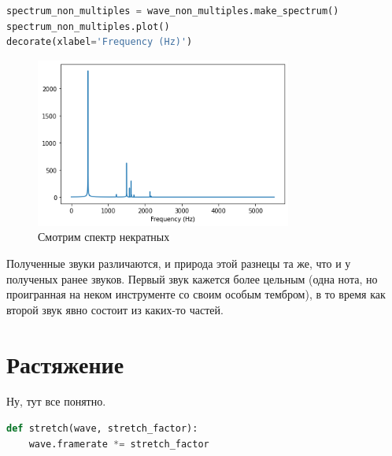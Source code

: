 \documentclass[a4paper,12pt]{report}
\begin{document}
\begin{lstlisting}[language=Python,caption=Смотрим спектр некратных]
spectrum_non_multiples = wave_non_multiples.make_spectrum()
spectrum_non_multiples.plot()
decorate(xlabel='Frequency (Hz)')
\end{lstlisting}

    \begin{figure}[H]
        \centering
        \includegraphics[width=0.75\textwidth]{ex3_spectrum_of_non_multiples_series.png}
        \caption{Смотрим спектр некратных}
        \label{fig:ex3_spectrum_of_non_multiples_series}
    \end{figure}
    
    Полученные звуки различаются, и природа этой разнецы та же, что и у полученых ранее звуков. Первый звук кажется более цельным (одна нота, но проигранная на неком инструменте со своим особым тембром), в то время как второй звук явно состоит из каких-то частей.
    
    \chapter{Растяжение}

    Ну, тут все понятно.

\begin{lstlisting}[language=Python,caption=Растягиваем \texttt{Wave}]
def stretch(wave, stretch_factor):
    wave.framerate *= stretch_factor
\end{lstlisting}
\end{document}
